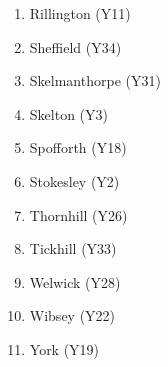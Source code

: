 \begin{refsection}
\begin{multicols}{2}
\begin{enumerate}
			\item Rillington (Y11)
			\item Sheffield (Y34)
			\item Skelmanthorpe (Y31)
			\item Skelton (Y3)
			\item Spofforth (Y18)
			\item Stokesley (Y2)
			\item Thornhill (Y26)
			\item Tickhill (Y33)
			\item Welwick (Y28)
			\item Wibsey (Y22)
			\item York (Y19)
		\end{enumerate}
	\end{multicols}
\end{refsection}
	
